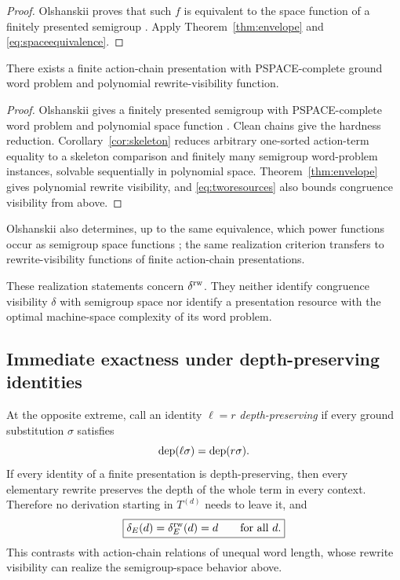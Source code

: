 \begin{proof}
Olshanskii proves that such $f$ is equivalent to the space function of a finitely presented semigroup \cite[Corollary~1.4]{Olshanskii2013}.  Apply Theorem~\ref{thm:envelope} and \eqref{eq:spaceequivalence}.
\end{proof}

\begin{corollary}
There exists a finite action-chain presentation with PSPACE-complete ground word problem and polynomial rewrite-visibility function.
\end{corollary}

\begin{proof}
Olshanskii gives a finitely presented semigroup with PSPACE-complete word problem and polynomial space function \cite[Corollary~1.5]{Olshanskii2013}.  Clean chains give the hardness reduction.  Corollary~\ref{cor:skeleton} reduces arbitrary one-sorted action-term equality to a skeleton comparison and finitely many semigroup word-problem instances, solvable sequentially in polynomial space.  Theorem~\ref{thm:envelope} gives polynomial rewrite visibility, and \eqref{eq:tworesources} also bounds congruence visibility from above.
\end{proof}

Olshanskii also determines, up to the same equivalence, which power functions occur as semigroup space functions \cite[Corollary~1.6]{Olshanskii2013}; the same realization criterion transfers to rewrite-visibility functions of finite action-chain presentations.

These realization statements concern $\delta^{\mathrm{rw}}$. They neither identify congruence visibility $\delta$ with semigroup space nor identify a presentation resource with the optimal machine-space complexity of its word problem.

\subsection{Immediate exactness under depth-preserving identities}

At the opposite extreme, call an identity $\ell=r$ \emph{depth-preserving} if every ground substitution $\sigma$ satisfies
\[
\operatorname{dep}(\ell\sigma)=\operatorname{dep}(r\sigma).
\]
If every identity of a finite presentation is depth-preserving, then every elementary rewrite preserves the depth of the whole term in every context.  Therefore no derivation starting in $T^{(d)}$ needs to leave it, and
\[
\boxed{\delta_E(d)=\delta^{\mathrm{rw}}_E(d)=d\qquad\text{for all }d.}
\]
This contrasts with action-chain relations of unequal word length, whose rewrite visibility can realize the semigroup-space behavior above.

